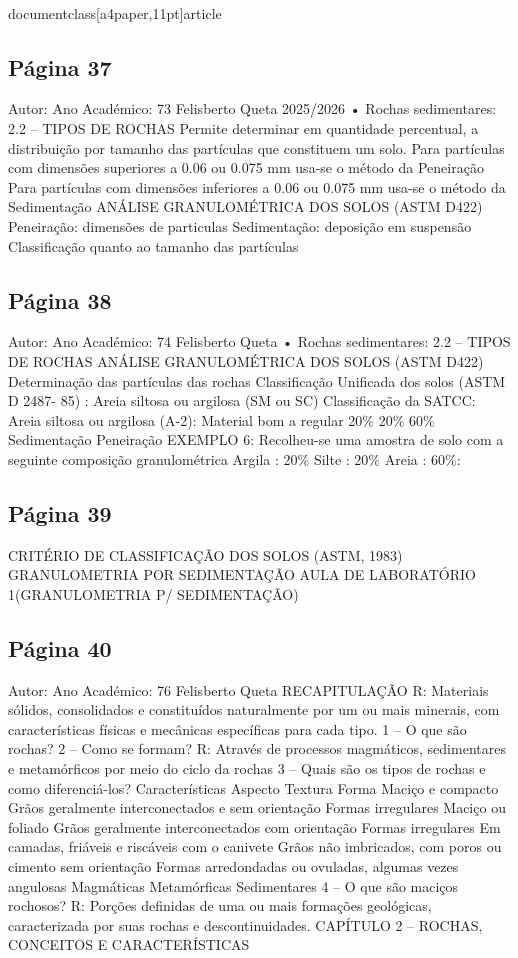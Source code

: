 \\documentclass[a4paper,11pt]{article}
\begin{document}
\subsection*{Página 37}
Autor:
Ano Académico:
73
Felisberto Queta
2025/2026
•
Rochas sedimentares: 
2.2 – TIPOS DE ROCHAS
Permite determinar em quantidade percentual, a distribuição por tamanho das partículas que
constituem um solo.
Para partículas com dimensões superiores a 0.06 ou 0.075 mm usa-se o método da Peneiração
Para partículas com dimensões inferiores a 0.06 ou 0.075 mm usa-se o método da Sedimentação
ANÁLISE GRANULOMÉTRICA DOS SOLOS (ASTM D422)
Peneiração: dimensões de particulas
Sedimentação: deposição em suspensão
Classificação quanto ao tamanho das partículas  



\subsection*{Página 38}
Autor:
Ano Académico:
74
Felisberto Queta
•
Rochas sedimentares: 
2.2 – TIPOS DE ROCHAS
ANÁLISE GRANULOMÉTRICA DOS SOLOS (ASTM D422)
Determinação das partículas das rochas  
Classificação Unificada dos solos (ASTM D 2487- 85) : Areia siltosa ou argilosa (SM ou SC)
Classificação da SATCC: Areia siltosa ou argilosa (A-2): Material bom a regular
20\%
20\%
60\%
Sedimentação
Peneiração
EXEMPLO 6:
Recolheu-se uma amostra de 
solo com a seguinte 
composição granulométrica
Argila : 20\%
Silte : 20\% 
Areia : 60\%:



\subsection*{Página 39}
CRITÉRIO DE CLASSIFICAÇÃO DOS SOLOS (ASTM, 1983)
GRANULOMETRIA POR SEDIMENTAÇÃO
AULA DE LABORATÓRIO 1(GRANULOMETRIA P/ 
SEDIMENTAÇÃO)



\subsection*{Página 40}
Autor:
Ano Académico:
76
Felisberto Queta
RECAPITULAÇÃO
R: Materiais sólidos, consolidados e constituídos naturalmente por um ou mais minerais, com 
características físicas e mecânicas específicas para cada tipo. 
1 – O que são rochas? 
2 – Como se formam?
R: Através de processos magmáticos, sedimentares e metamórficos por meio do ciclo da rochas
3 – Quais são os tipos de rochas e como diferenciá-los?
Características
Aspecto
Textura
Forma
Maciço e compacto
Grãos geralmente 
interconectados e sem 
orientação
Formas irregulares
Maciço ou foliado
Grãos geralmente 
interconectados com orientação
Formas irregulares
Em camadas, friáveis e riscáveis com 
o canivete
Grãos não imbricados, com poros ou
cimento sem orientação
Formas arredondadas ou ovuladas, 
algumas vezes angulosas
Magmáticas
Metamórficas
Sedimentares
4 – O que são maciços rochosos?
R: Porções definidas de uma ou mais formações geológicas, caracterizada por suas rochas e 
descontinuidades.
CAPÍTULO 2 – ROCHAS, CONCEITOS E CARACTERÍSTICAS
\end{document}
